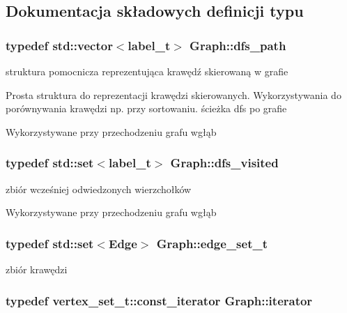 \subsection{Dokumentacja składowych definicji typu}
\hypertarget{classGraph_a8d2f79e14998a438e64bf07f31abb359}{
\subsubsection[{dfs\-\_\-path}]{\setlength{\rightskip}{0pt plus 5cm}typedef std\-::vector$<${\bf label\-\_\-t}$>$ {\bf Graph\-::dfs\-\_\-path}}}\label{classGraph_a8d2f79e14998a438e64bf07f31abb359}


struktura pomocnicza reprezentująca krawędź skierowaną w grafie 

Prosta struktura do reprezentacji krawędzi skierowanych. Wykorzystywania do porównywania krawędzi np. przy sortowaniu. ścieżka dfs po grafie

Wykorzystywane przy przechodzeniu grafu wgłąb \hypertarget{classGraph_af10e18e1cb3834650bd69bad6bec3fc0}{
\subsubsection[{dfs\-\_\-visited}]{\setlength{\rightskip}{0pt plus 5cm}typedef std\-::set$<${\bf label\-\_\-t}$>$ {\bf Graph\-::dfs\-\_\-visited}}}\label{classGraph_af10e18e1cb3834650bd69bad6bec3fc0}


zbiór wcześniej odwiedzonych wierzchołków 

Wykorzystywane przy przechodzeniu grafu wgłąb \hypertarget{classGraph_a7875f5959501bdafb3ba4dd428dfb10b}{
\subsubsection[{edge\-\_\-set\-\_\-t}]{\setlength{\rightskip}{0pt plus 5cm}typedef std\-::set$<${\bf Edge}$>$ {\bf Graph\-::edge\-\_\-set\-\_\-t}}}\label{classGraph_a7875f5959501bdafb3ba4dd428dfb10b}


zbiór krawędzi 

\hypertarget{classGraph_a865985566962f6fcab1c0a465305424f}{
\subsubsection[{iterator}]{\setlength{\rightskip}{0pt plus 5cm}typedef vertex\-\_\-set\-\_\-t\-::const\-\_\-iterator {\bf Graph\-::iterator}}}\label{classGraph_a865985566962f6fcab1c0a465305424f}


